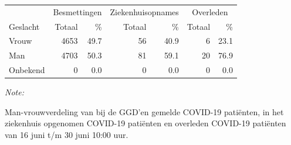 \documentclass[
  english,
  man,floatsintext]{apa6}
\begin{document}
\begin{table}
\centering\begingroup\fontsize{11}{13}\selectfont

\begin{threeparttable}
\begin{tabular}{lrrrrrr}
\toprule
\multicolumn{1}{c}{ } & \multicolumn{2}{c}{Besmettingen} & \multicolumn{2}{c}{Ziekenhuisopnames} & \multicolumn{2}{c}{Overleden} \\
\cmidrule(l{3pt}r{3pt}){2-3} \cmidrule(l{3pt}r{3pt}){4-5} \cmidrule(l{3pt}r{3pt}){6-7}
Geslacht & Totaal & \% & Totaal & \% & Totaal & \%\\
\midrule
Vrouw & 4653 & 49.7 & 56 & 40.9 & 6 & 23.1\\
Man & 4703 & 50.3 & 81 & 59.1 & 20 & 76.9\\
Onbekend & 0 & 0.0 & 0 & 0.0 & 0 & 0.0\\
\bottomrule
\end{tabular}
\begin{tablenotes}
\item \textit{Note: } 
\item Man-vrouwverdeling van bij de GGD’en gemelde COVID-19 patiënten, in het ziekenhuis opgenomen COVID-19 patiënten en overleden COVID-19 patiënten van 16 juni t/m 30 juni 10:00 uur.
\end{tablenotes}
\end{threeparttable}
\endgroup{}
\end{table}
\newpage
\end{document}
